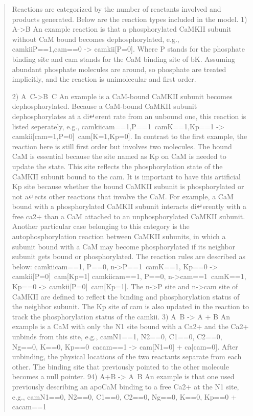 \begin{quote}
Reactions are categorized by the number of reactants involved and products generated. Below are the reaction types included in the model.
1) A->B
An example reaction is that a phosphorylated CaMKII subunit without CaM bound becomes
dephosphorylated, e.g.,
camkii{P==1,cam==0} -> camkii[P=0].
Where P stands for the phosphate binding site and cam stands for the CaM binding site of bK. Assuming abundant phosphate molecules are around, so phosphate are treated implicitly, and the reaction is unimolecular and first order.

2) A~C->B~C
An example is a CaM-bound CaMKII subunit becomes dephosphorylated. Because a CaM-bound CaMKII subunit dephosphorylates at a di↵erent rate from an unbound one, this reaction is listed seperately, e.g.,
camkii{cam==1,P==1}~cam{K==1,Kp==1} -> camkii[cam=1,P=0]~cam[K=1,Kp=0].
In contrast to the first example, the reaction here is still first order but involves two molecules.
The bound CaM is essential because the site named as Kp on CaM is needed to update the
state. This site reflects the phosphorylation state of the CaMKII subunit bound to the cam. It
is important to have this artificial Kp site because whether the bound CaMKII subunit is
phosphorylated or not a↵ects other reactions that involve the CaM. For example, a CaM bound
with a phosphorylated CaMKII subunit interacts di↵erently with a free ca2+ than a CaM
attached to an unphosphorylated CaMKII subunit.
Another particular case belonging to this category is the autophosphorylation reaction between
CaMKII subunits, in which a subunit bound with a CaM may become phosphorylated if its
neighbor subunit gets bound or phosphorylated. The reaction rules are described as below:
camkii{cam==1, P==0, n->P==1}~cam{K==1, Kp==0} -> camkii[P=0]~cam[Kp=1]
camkii{cam==1, P==0, n->cam==1}~cam{K==1, Kp==0} -> camkii[P=0]~cam[Kp=1].
The n->P site and n->cam site of CaMKII are defined to reflect the binding and phosphorylation
status of the neighbor subunit. The Kp site of cam is also updated in the reaction to track the
phosphorylation status of the camkii.
3) A~B -> A + B
An example is a CaM with only the N1 site bound with a Ca2+ and the Ca2+ unbinds from
this site, e.g.,
cam{N1==1, N2==0, C1==0, C2==0, Ng==0, K==0, Kp==0}~ca{cam==1}
-> cam[N1=0] + ca[cam=0].
After unbinding, the physical locations of the two reactants separate from each other. The
binding site that previously pointed to the other molecule becomes a null pointer.
94) A+B -> A~B
An example is that one used previously describing an apoCaM binding to a free Ca2+ at the N1
site, e.g.,
cam{N1==0, N2==0, C1==0, C2==0, Ng==0, K==0, Kp==0} + ca{cam==1}

\end{quote}
